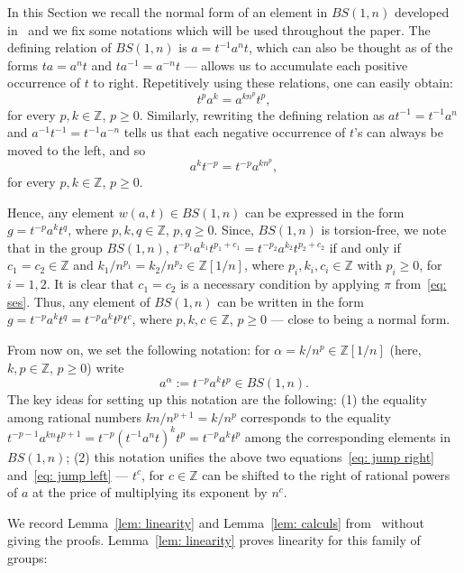 \documentclass[a4paper]{amsart}
\theoremstyle{definition}
\newcommand\ZZ{\mathbb{Z}}
\begin{document}
In this Section we recall the normal form of an element in $BS(1, n)$ developed in~\cite[Section 2.1]{Roy-Ventura-Mitra} and we fix some notations which will be used throughout the paper. The defining relation of $BS(1,n)$ is $a = t^{-1} a^n t$, which can also be thought as of the forms $ta = a^n t$ and $ta^{-1} = a^{-n}t$ --- allows us to accumulate each positive occurrence of $t$ to right. Repetitively using these relations, one can easily obtain:
%
\begin{equation}\label{eq: jump right}
t^p a^k =a^{kn^p}t^p,
 \end{equation}
%
for every $p,k\in \ZZ$, $p\geq 0$. Similarly, rewriting the defining relation as $at^{-1} = t^{-1}a^n $ and $a^{-1}t^{-1} = t^{-1}a^{-n}$ tells us that each negative occurrence of $t$'s can always be moved to the left, and so
%
\begin{equation}\label{eq: jump left}
a^k t^{-p}=t^{-p}a^{kn^p},
 \end{equation}
%
for every $p,k\in \ZZ$, $p\geq 0$.
%

Hence, any element $w(a,t)\in BS(1,n)$ can be expressed in the form $g=t^{-p}a^k t^q$, where $p,k,q\in \ZZ$, $p,q\geq 0$. Since, $BS(1,n)$ is torsion-free, we note that in the group $BS(1,n)$, $t^{-p_1}a^{k_1} t^{p_1+c_1}=t^{-p_2}a^{k_2} t^{p_2+c_2}$ if and only if $c_1 =c_2 \in \ZZ$ and $k_1/n^{p_1}=k_2/n^{p_2}\in \ZZ[1/n]$, where $p_i, k_i, c_i\in \ZZ$ with $p_i\geq 0$, for $i=1,2$. It is clear that $c_1=c_2$ is a necessary condition by applying $\pi$ from~\eqref{eq: ses}.
Thus, any element of $BS(1,n)$ can be written in the form $g= t^{-p}a^k t^q =t^{-p}a^k t^p t^c$, where $p,k, c\in \ZZ$, $p\geq 0$ --- close to being a normal form. 

From now on, we set the following notation: for $\alpha =k/n^p\in \ZZ[1/n]$ (here, $k,p\in \ZZ$, $p\geq 0$) write
%
 \[a^{\alpha}:=t^{-p}a^k t^p \in BS(1,n).\]
%
The key ideas for setting up this notation are the following: (1) the equality among rational numbers $kn/n^{p+1} =k/n^p$ corresponds to the equality $t^{-p-1}a^{kn} t^{p+1}=t^{-p} (t^{-1}a^n t)^k t^p=t^{-p}a^k t^p$ among the corresponding elements in $BS(1,n)$; (2) this notation unifies the above two equations~\eqref{eq: jump right} and~\eqref{eq: jump left} --- $t^c$, for $c\in \ZZ$ can be shifted to the right of rational powers of $a$ at the price of multiplying its exponent by $n^c$.

We record Lemma~\ref{lem: linearity} and Lemma~\ref{lem: calculs} from~\cite{Roy-Ventura-Mitra} without giving the proofs. Lemma~\ref{lem: linearity} proves linearity for this family of groups: 
\end{document}
